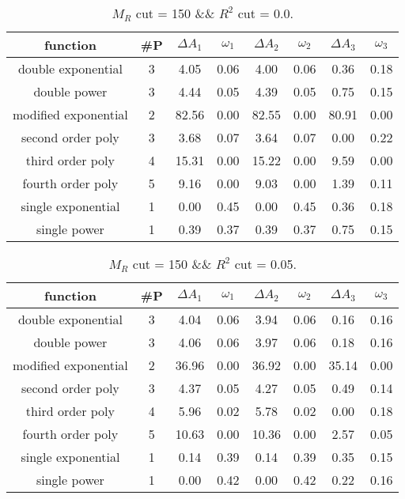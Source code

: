  
\begin{table}[H] 
\begin{center} 
\begin{tabular}{|c|c|cc|cc|cc|} 
\hline function & \#P & $\Delta A_1$ & $\omega_1$ & $\Delta A_2$ & $\omega_2$ & $\Delta A_3$ & $\omega_3$ \\ \hline 
double exponential &  3 &   4.05 &   0.06 &   4.00 &   0.06 &   0.36 &   0.18 \\ 
double power &  3 &   4.44 &   0.05 &   4.39 &   0.05 &   0.75 &   0.15 \\ 
modified exponential &  2 &  82.56 &   0.00 &  82.55 &   0.00 &  80.91 &   0.00 \\ 
second order poly &  3 &   3.68 &   0.07 &   3.64 &   0.07 &   0.00 &   0.22 \\ 
third order poly &  4 &  15.31 &   0.00 &  15.22 &   0.00 &   9.59 &   0.00 \\ 
fourth order poly &  5 &   9.16 &   0.00 &   9.03 &   0.00 &   1.39 &   0.11 \\ 
single exponential &  1 &   0.00 &   0.45 &   0.00 &   0.45 &   0.36 &   0.18 \\ 
single power &  1 &   0.39 &   0.37 &   0.39 &   0.37 &   0.75 &   0.15 \\ 
\hline 
\end{tabular} 
\caption{$M_R$ cut = 150 \&\& $R^2$ cut = 0.0.} 
\label{tab:FitChoices_150_0.0} 
\end{center} 
\end{table} 
 
 
\begin{table}[H] 
\begin{center} 
\begin{tabular}{|c|c|cc|cc|cc|} 
\hline function & \#P & $\Delta A_1$ & $\omega_1$ & $\Delta A_2$ & $\omega_2$ & $\Delta A_3$ & $\omega_3$ \\ \hline 
double exponential &  3 &   4.04 &   0.06 &   3.94 &   0.06 &   0.16 &   0.16 \\ 
double power &  3 &   4.06 &   0.06 &   3.97 &   0.06 &   0.18 &   0.16 \\ 
modified exponential &  2 &  36.96 &   0.00 &  36.92 &   0.00 &  35.14 &   0.00 \\ 
second order poly &  3 &   4.37 &   0.05 &   4.27 &   0.05 &   0.49 &   0.14 \\ 
third order poly &  4 &   5.96 &   0.02 &   5.78 &   0.02 &   0.00 &   0.18 \\ 
fourth order poly &  5 &  10.63 &   0.00 &  10.36 &   0.00 &   2.57 &   0.05 \\ 
single exponential &  1 &   0.14 &   0.39 &   0.14 &   0.39 &   0.35 &   0.15 \\ 
single power &  1 &   0.00 &   0.42 &   0.00 &   0.42 &   0.22 &   0.16 \\ 
\hline 
\end{tabular} 
\caption{$M_R$ cut = 150 \&\& $R^2$ cut = 0.05.} 
\label{tab:FitChoices_150_0.05} 
\end{center} 
\end{table} 
 
